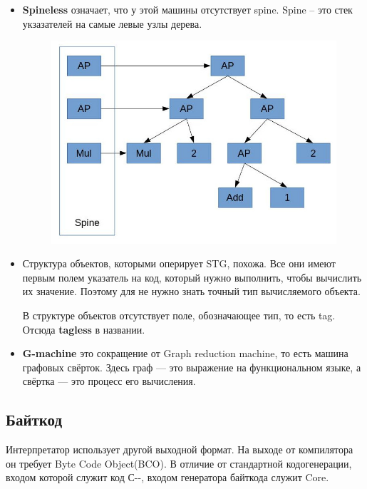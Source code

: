 \documentclass[fontsize=14pt, paper=a4, pagesize, DIV=calc]{scrartcl}
\begin{document}
\begin{itemize}

\item \textbf{Spineless} означает, что у этой машины отсутствует spine. Spine -- это стек
укзазателей на самые левые узлы дерева.

\begin{figure}[H]
\centering
\includegraphics[scale=0.7]{spine.jpg}
\end{figure}

\item Структура объектов, которыми оперирует STG, похожа. Все они имеют первым
полем указатель на код, который нужно выполнить, чтобы вычислить их значение.
Поэтому для не нужно знать точный тип вычисляемого объекта. 

В структуре объектов отсутствует поле, обозначающее тип, то есть tag. Отсюда
\textbf{tagless} в
названии.

\item \textbf{G-machine} это сокращение от Graph reduction machine, то есть
машина графовых свёрток. Здесь граф --- это выражение на функциональном языке, а
свёртка --- это процесс его вычисления.

\end{itemize}

\subsection{Байткод}

Интерпретатор использует другой выходной формат. На выходе от компилятора он
требует Byte Code Object(BCO). В отличие от стандартной кодогенерации, входом
которой служит код С-{}-, входом генератора байткода служит Core.
\end{document}

